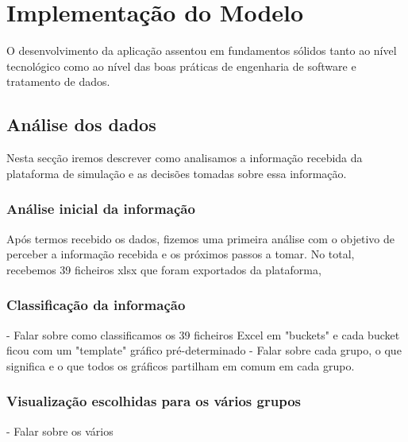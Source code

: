 



\chapter{Implementação do Modelo}
\label{ch:implementacaoDoModelo}

O desenvolvimento da aplicação assentou em fundamentos sólidos tanto ao nível tecnológico como ao nível das boas práticas de engenharia de software e tratamento de dados. 

\section{Análise dos dados}
Nesta secção iremos descrever como analisamos a informação recebida da plataforma de simulação e as decisões tomadas sobre essa informação.

\subsection{Análise inicial da informação}
Após termos recebido os dados, fizemos uma primeira análise com o objetivo de perceber a informação recebida e os próximos passos a tomar. No total, recebemos 39 ficheiros \gls{xlsx} que foram exportados da plataforma, 

\subsection{Classificação da informação}

- Falar sobre como classificamos os 39 ficheiros Excel em "buckets" e cada bucket ficou com um "template" gráfico pré-determinado
- Falar sobre cada grupo, o que significa e o que todos os gráficos partilham em comum em cada grupo.

\subsection{Visualização escolhidas para os vários grupos}
- Falar sobre os vários

